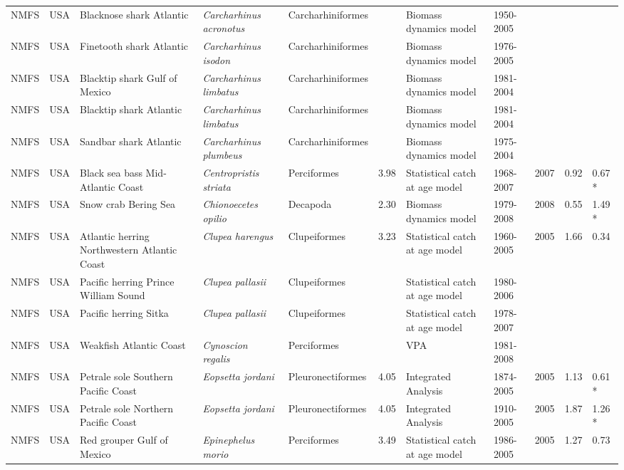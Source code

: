 \begin{longtable}{p{1.5cm}p{1.5cm}p{3cm}p{3cm}p{2.5cm}p{0.9cm}p{1.4cm}p{0.9cm}p{0.9cm}p{0.9cm}p{1cm}}
  NMFS & USA & Blacknose shark Atlantic & \textit{Carcharhinus acronotus} & Carcharhiniformes &  & Biomass dynamics model & 1950-2005 &  &  &  \\ 
  NMFS & USA & Finetooth shark Atlantic & \textit{Carcharhinus isodon} & Carcharhiniformes &  & Biomass dynamics model & 1976-2005 &  &  &  \\ 
  NMFS & USA & Blacktip shark Gulf of Mexico & \textit{Carcharhinus limbatus} & Carcharhiniformes &  & Biomass dynamics model & 1981-2004 &  &  &  \\ 
  NMFS & USA & Blacktip shark Atlantic & \textit{Carcharhinus limbatus} & Carcharhiniformes &  & Biomass dynamics model & 1981-2004 &  &  &  \\ 
  NMFS & USA & Sandbar shark Atlantic & \textit{Carcharhinus plumbeus} & Carcharhiniformes &  & Biomass dynamics model & 1975-2004 &  &  &  \\ 
  NMFS & USA & Black sea bass Mid-Atlantic Coast & \textit{Centropristis striata} & Perciformes & 3.98 & Statistical catch at age model & 1968-2007 & 2007 & 0.92 & 0.67 * \\ 
  NMFS & USA & Snow crab Bering Sea & \textit{Chionoecetes opilio} & Decapoda & 2.30 & Biomass dynamics model & 1979-2008 & 2008 & 0.55 & 1.49 * \\ 
  NMFS & USA & Atlantic herring Northwestern Atlantic Coast & \textit{Clupea harengus} & Clupeiformes & 3.23 & Statistical catch at age model & 1960-2005 & 2005 & 1.66 & 0.34 \\ 
  NMFS & USA & Pacific herring Prince William Sound & \textit{Clupea pallasii} & Clupeiformes &  & Statistical catch at age model & 1980-2006 &  &  &  \\ 
  NMFS & USA & Pacific herring Sitka & \textit{Clupea pallasii} & Clupeiformes &  & Statistical catch at age model & 1978-2007 &  &  &  \\ 
  NMFS & USA & Weakfish Atlantic Coast & \textit{Cynoscion regalis} & Perciformes &  & VPA & 1981-2008 &  &  &  \\ 
  NMFS & USA & Petrale sole Southern Pacific Coast & \textit{Eopsetta jordani} & Pleuronectiformes & 4.05 & Integrated Analysis & 1874-2005 & 2005 & 1.13 & 0.61 * \\ 
  NMFS & USA & Petrale sole Northern Pacific Coast & \textit{Eopsetta jordani} & Pleuronectiformes & 4.05 & Integrated Analysis & 1910-2005 & 2005 & 1.87 & 1.26 * \\ 
  NMFS & USA & Red grouper Gulf of Mexico & \textit{Epinephelus morio} & Perciformes & 3.49 & Statistical catch at age model & 1986-2005 & 2005 & 1.27 & 0.73 \\ 

\end{longtable}
